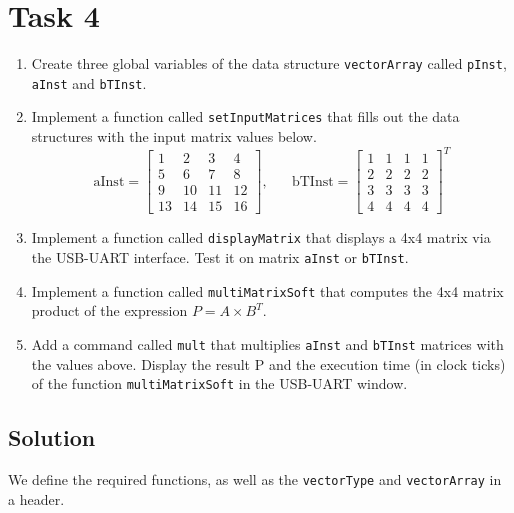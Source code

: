 \documentclass[../main.tex]{subfiles}
\begin{document}
\section{Task 4}

\begin{enumerate}
    \item Create three global variables of the data structure \texttt{vectorArray} called \texttt{pInst}, \texttt{aInst} and \texttt{bTInst}.
    \item Implement a function called \texttt{setInputMatrices} that fills out the data structures with the input matrix values below.
$$
\text{aInst} = 
\begin{bmatrix}
1  & 2  & 3  & 4  \\
5  & 6  & 7  & 8  \\
9  & 10 & 11 & 12 \\
13 & 14 & 15 & 16
\end{bmatrix}
,\hspace{20pt}
\text{bTInst} = 
\begin{bmatrix}
1 & 1 & 1 & 1 \\
2 & 2 & 2 & 2 \\
3 & 3 & 3 & 3 \\
4 & 4 & 4 & 4
\end{bmatrix}^T
$$
    \item Implement a function called \texttt{displayMatrix} that displays a 4x4 matrix via the USB-UART interface. Test it on matrix \texttt{aInst} or \texttt{bTInst}.
    \item Implement a function called \texttt{multiMatrixSoft} that computes the 4x4 matrix product of the expression $P = A \times B^T$.
    \item Add a command called \texttt{mult} that multiplies \texttt{aInst} and \texttt{bTInst} matrices with the values above. Display the result P and the execution time (in clock ticks) of the function \texttt{multiMatrixSoft} in the USB-UART window.
\end{enumerate}

\subsection*{Solution}

We define the required functions, as well as the \texttt{vectorType} and \texttt{vectorArray} in a header.
\end{document}
